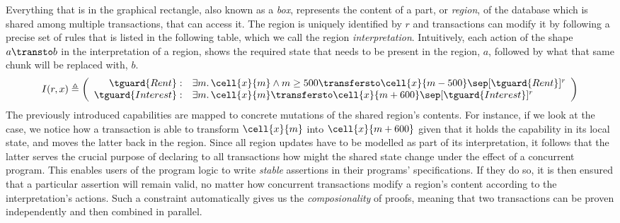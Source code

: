 Everything that is in the graphical rectangle, also known as a \textit{box}, represents the content of a part, or \textit{region}, of the database which is shared among multiple transactions, that can access it. The region is uniquely identified by $r$ and transactions can modify it by following a precise set of rules that is listed in the following table, which we call the region \textit{interpretation}. Intuitively, each action of the shape $a \transto b$ in the interpretation of a region, shows the required state that needs to be present in the region, $a$, followed by what that same chunk will be replaced with, $b$.
\[
	I(r, x) \triangleq \left( 
		\begin{array}{r l}
			\tguard{Rent}:
				&
			\exists m \ldotp \cell{x}{m} \land m \geq 500 \transfersto \cell{x}{m - 500} \sep [\tguard{Rent}]^r
			\\
			\tguard{Interest}:
				&
			\exists m \ldotp \cell{x}{m} \transfersto \cell{x}{m + 600} \sep [\tguard{Interest}]^r
		\end{array}
	 \right)
\]
The previously introduced capabilities are mapped to concrete mutations of the shared region's contents. For instance, if we look at the  case, we notice how a transaction is able to transform $\cell{x}{m}$ into $\cell{x}{m + 600}$ given that it holds the capability in its local state, and moves the latter back in the region. Since all region updates have to be modelled as part of its interpretation, it follows that the latter serves the crucial purpose of declaring to all transactions how might the shared state change under the effect of a concurrent program. This enables users of the program logic to write \textit{stable} assertions in their programs' specifications. If they do so, it is then ensured that a particular assertion will remain valid, no matter how concurrent transactions modify a region's content according to the interpretation's actions. Such a constraint automatically gives us the \textit{composionality} of proofs, meaning that two transactions can be proven independently and then combined in parallel.

